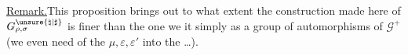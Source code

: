 \uline{Remark.}\quad This proposition brings out
to what extent the  construction made here of
$G_{\rho,\sigma}^{\unsure{\natural|\sharp}}$
is finer than the one 
we  it simply as a
group of automorphisms of $\mathcal G^+$
(we even  need
of the $\mu,\varepsilon,\varepsilon'$
into the \ldots).
